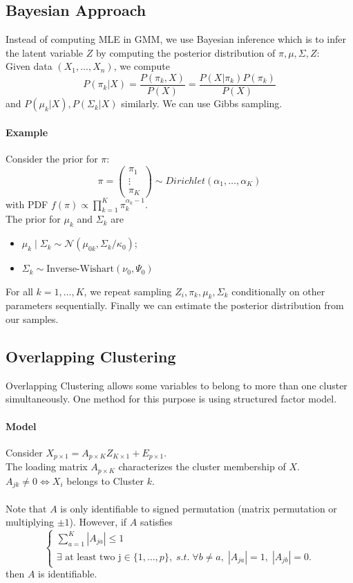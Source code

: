 \documentclass[12pt]{book}
\theoremstyle{definition}
\theoremstyle{remark}
\begin{document}
\subsection{Bayesian Approach}
Instead of computing MLE in GMM, we use Bayesian inference which is to infer the latent variable $Z$ by computing the posterior distribution of $\pi, \mu, \Sigma, Z$:\\

Given data $(X_1,\dots,X_n)$, we compute 
\[P(\pi_k|X) = \frac{P(\pi_k,X)}{P(X)} = \frac{P(X|\pi_k)P(\pi_k)}{P(X)}\]
and $P(\mu_k|X), P(\Sigma_k|X)$ similarly. We can use Gibbs sampling.

\paragraph{Example}
Consider the prior for $\pi$: \[\pi = \begin{pmatrix}
\pi_1\\\vdots\\\pi_K\end{pmatrix}\sim Dirichlet(\alpha_1,\dots, \alpha_K)\] 
with PDF $f(\pi) \propto \prod_{k=1}^K\pi_k^{\alpha_{k}-1}$. \\
The prior for $\mu_k$ and $\Sigma_k$ are 
\begin{itemize}
    \item $\mu_k \mid \Sigma_k \sim \mathcal{N}(\mu_{0k}, \Sigma_k / \kappa_0)$;
    \item $\Sigma_k \sim \text{Inverse-Wishart}(\nu_0, \Psi_0)$
\end{itemize}
For all $k = 1,\dots, K$, we repeat sampling $Z_i,\pi_k, \mu_k,\Sigma_k$ conditionally on other parameters sequentially. Finally we can estimate the posterior distribution from our samples.



\subsection{Overlapping Clustering}
Overlapping Clustering allows some variables to belong to more than one cluster simultaneously. One method for this purpose is using structured factor model.\\
\paragraph{Model}
Consider $X_{p\times 1} = A_{p\times K}Z_{K\times1}+E_{p\times1}$.\\
The loading matrix $A_{p\times K}$ characterizes the cluster membership of $X$. $A_{jk} \ne 0 \iff X_i $ belongs to Cluster $k$. \\
\\
Note that $A$ is only identifiable to signed permutation (matrix permutation or multiplying $\pm 1$). However, if $A$ satisfies
\[\begin{cases}
    \sum_{a=1}^K|A_{ja}|\le 1\\
    \exists \text{ at least two j}\in \{1,\dots,p\}, \;s.t.\;\forall b\ne a, \;|A_{ja}| = 1, \;|A_{jb}| = 0.
\end{cases}\]
then $A$ is identifiable.\\
\end{document}
